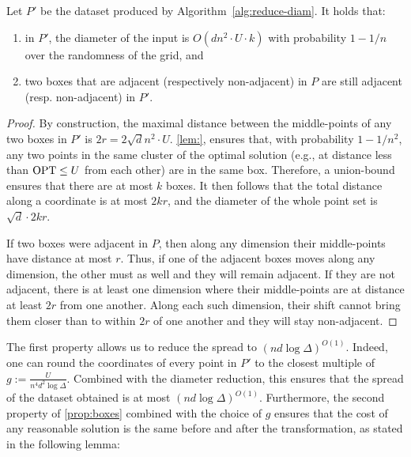 \begin{proposition}\label{prop:boxes}
    Let $P'$ be the dataset produced by Algorithm~\ref{alg:reduce-diam}. It holds that:
    \begin{enumerate}
        \item in $P'$, the diameter of the input is $O(d n^2\cdot U \cdot k)$ with probability $1-1/n$ over the randomness of the grid, and
        \item two boxes that are adjacent (respectively non-adjacent) in $P$ are still adjacent (resp. non-adjacent) in $P'$.
    \end{enumerate}
\end{proposition}
\begin{proof}

By construction, the maximal distance between the middle-points of any two boxes in $P'$ is $2r = 2\sqrt d n^2\cdot U$. \cref{lem:}, ensures that, with
probability $1-1/n^2$, any two points in the same cluster of the optimal solution (e.g., at distance less than $\text{OPT} \leq U$ from each other) are in the same
box. Therefore, a union-bound ensures that there are at most $k$ boxes.  It then follows that the total distance along a coordinate is at most $2kr$, and the
diameter of the whole point set is $\sqrt{d} \cdot 2kr$.

If two boxes were adjacent in $P$, then along any dimension their middle-points have distance at most $r$. Thus, if one of the adjacent boxes moves along any
dimension, the other must as well and they will remain adjacent.  If they are not adjacent, there is at least one dimension where their middle-points are at
distance at least $2r$ from one another. Along each such dimension, their shift cannot bring them closer than to within $2r$ of one another and they will stay
non-adjacent.

\end{proof}

The first property allows us to reduce the spread to $(nd \log \Delta)^{O(1)}$.  Indeed, one can round the coordinates of every point in $P'$ to the closest
multiple of $g := \frac{U}{n^4 d^{2} \log \Delta}$.  Combined with the diameter reduction, this ensures that the spread of the dataset obtained is at most $(nd
\log \Delta)^{O(1)}$.  Furthermore, the second property of \cref{prop:boxes} combined with the choice of $g$ ensures that the cost of any reasonable solution is
the same before and after the transformation, as stated in the following lemma:


